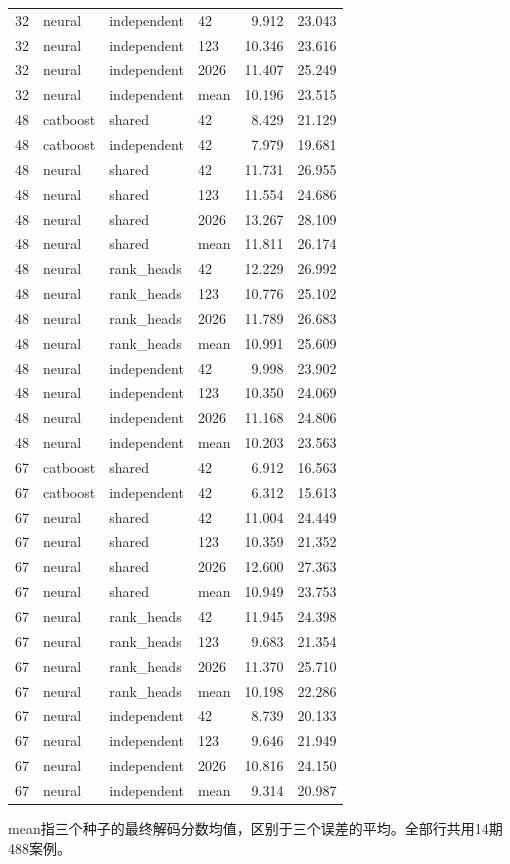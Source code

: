 \begin{longtable}{r l l l r r}
32 & neural & independent & 42 & 9.912 & 23.043 \\
32 & neural & independent & 123 & 10.346 & 23.616 \\
32 & neural & independent & 2026 & 11.407 & 25.249 \\
32 & neural & independent & mean & 10.196 & 23.515 \\
48 & catboost & shared & 42 & 8.429 & 21.129 \\
48 & catboost & independent & 42 & 7.979 & 19.681 \\
48 & neural & shared & 42 & 11.731 & 26.955 \\
48 & neural & shared & 123 & 11.554 & 24.686 \\
48 & neural & shared & 2026 & 13.267 & 28.109 \\
48 & neural & shared & mean & 11.811 & 26.174 \\
48 & neural & rank\_heads & 42 & 12.229 & 26.992 \\
48 & neural & rank\_heads & 123 & 10.776 & 25.102 \\
48 & neural & rank\_heads & 2026 & 11.789 & 26.683 \\
48 & neural & rank\_heads & mean & 10.991 & 25.609 \\
48 & neural & independent & 42 & 9.998 & 23.902 \\
48 & neural & independent & 123 & 10.350 & 24.069 \\
48 & neural & independent & 2026 & 11.168 & 24.806 \\
48 & neural & independent & mean & 10.203 & 23.563 \\
67 & catboost & shared & 42 & 6.912 & 16.563 \\
67 & catboost & independent & 42 & 6.312 & 15.613 \\
67 & neural & shared & 42 & 11.004 & 24.449 \\
67 & neural & shared & 123 & 10.359 & 21.352 \\
67 & neural & shared & 2026 & 12.600 & 27.363 \\
67 & neural & shared & mean & 10.949 & 23.753 \\
67 & neural & rank\_heads & 42 & 11.945 & 24.398 \\
67 & neural & rank\_heads & 123 & 9.683 & 21.354 \\
67 & neural & rank\_heads & 2026 & 11.370 & 25.710 \\
67 & neural & rank\_heads & mean & 10.198 & 22.286 \\
67 & neural & independent & 42 & 8.739 & 20.133 \\
67 & neural & independent & 123 & 9.646 & 21.949 \\
67 & neural & independent & 2026 & 10.816 & 24.150 \\
67 & neural & independent & mean & 9.314 & 20.987 \\
\bottomrule
\end{longtable}
\noindent mean指三个种子的最终解码分数均值，区别于三个误差的平均。全部行共用14期488案例。\par
\endgroup
